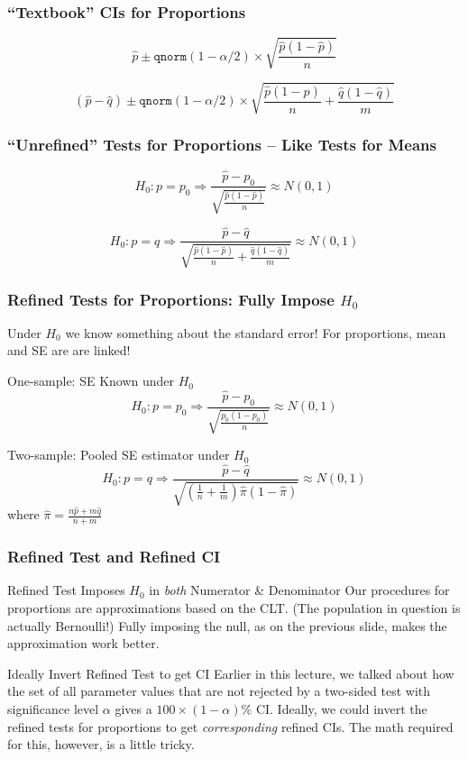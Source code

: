 \documentclass[handout]{beamer}
\begin{document}
\begin{frame}
\frametitle{``Textbook'' CIs for Proportions}
	$$\widehat{p} \pm \texttt{qnorm}(1 - \alpha/2) \times \sqrt{\frac{\hat{p}(1-\hat{p})}{n}}$$
	
	$$\left(\widehat{p} -\widehat{q}\right)\pm \texttt{qnorm}(1 - \alpha/2) \times \sqrt{\frac{\hat{p}(1-\hat{p})}{n} + \frac{\hat{q}(1-\hat{q})}{m}}$$
\end{frame}
\begin{frame}
	\frametitle{``Unrefined'' Tests for Proportions -- Like Tests for Means}
	$$H_0\colon p = p_0 \Rightarrow \frac{\hat{p} - p_0}{\sqrt{\frac{\hat{p}(1-\hat{p})}{n}}} \approx N(0,1)$$
	\vspace{1em}
	
	$$H_0\colon p = q \Rightarrow \frac{\hat{p} - \hat{q}}{\sqrt{\frac{\hat{p}(1-\hat{p})}{n} + \frac{\hat{q}(1-\hat{q})}{m}}} \approx N(0,1)$$
\end{frame}
\begin{frame}
\frametitle{Refined Tests for Proportions: Fully Impose $H_0$}

\begin{block}{Under $H_0$ we know something about the standard error!}
For proportions, mean and SE are are linked!
\end{block}
\begin{block}{One-sample: SE Known under $H_0$}
	$$H_0\colon p = p_0 \Rightarrow \frac{\hat{p} - p_0}{\sqrt{\frac{p_0(1-p_0)}{n}}} \approx N(0,1)$$
\end{block}
	\pause
\begin{block}{Two-sample: Pooled SE estimator under $H_0$}
	$$H_0\colon p = q \Rightarrow \frac{\hat{p} - \hat{q}}{\sqrt{\left(\frac{1}{n} + \frac{1}{m} \right)\widehat{\pi}(1-\widehat{\pi})}} \approx N(0,1)$$
	where $\widehat{\pi} = \frac{n\widehat{p} + m\widehat{q}}{n+m}$
\end{block}
\end{frame}
\begin{frame}
\frametitle{Refined Test and Refined CI}
\small
\begin{block}{Refined Test Imposes $H_0$ in \emph{both} Numerator \& Denominator}
Our procedures for proportions are approximations based on the CLT. (The population in question is actually Bernoulli!) Fully imposing the null, as on the previous slide, makes the approximation work better.
\end{block}

\pause

\begin{block}{Ideally Invert Refined Test to get CI}
Earlier in this lecture, we talked about how the set of all parameter values that are not rejected by a two-sided test with significance level $\alpha$ gives a $100\times(1-\alpha)\%$ CI. Ideally, we could invert the refined tests for proportions to get \emph{corresponding} refined CIs. The math required for this, however, is a little tricky.
\end{block}

\end{frame}
\end{document}
